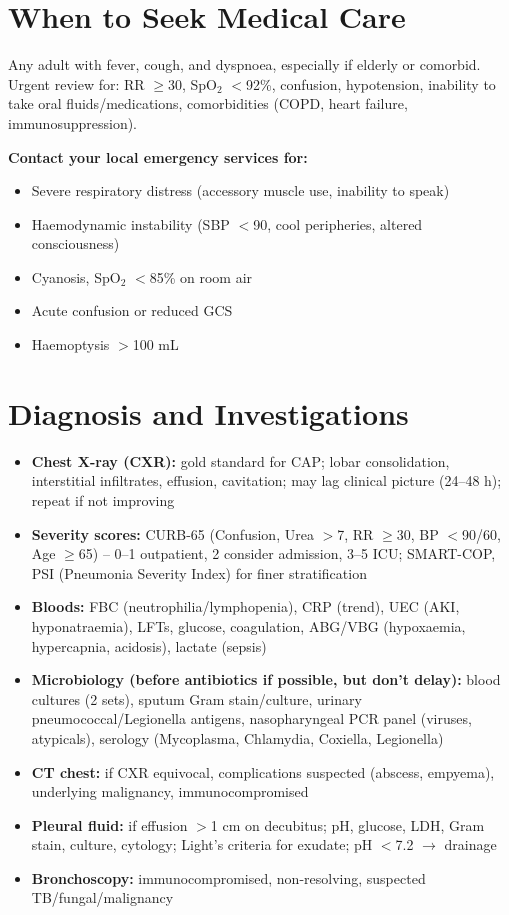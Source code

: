 \section*{When to Seek Medical Care}
Any adult with fever, cough, and dyspnoea, especially if elderly or comorbid. Urgent review for: RR $\ge$30, SpO$_2$ $<$92\%, confusion, hypotension, inability to take oral fluids/medications, comorbidities (COPD, heart failure, immunosuppression).

\textbf{Contact your local emergency services for:}
\begin{itemize}
    \item Severe respiratory distress (accessory muscle use, inability to speak)
    \item Haemodynamic instability (SBP $<$90, cool peripheries, altered consciousness)
    \item Cyanosis, SpO$_2$ $<$85\% on room air
    \item Acute confusion or reduced GCS
    \item Haemoptysis $>$100 mL
\end{itemize}

\section*{Diagnosis and Investigations}
\begin{itemize}
    \item \textbf{Chest X-ray (CXR):} gold standard for CAP; lobar consolidation, interstitial infiltrates, effusion, cavitation; may lag clinical picture (24--48 h); repeat if not improving
    \item \textbf{Severity scores:} CURB-65 (Confusion, Urea $>$7, RR $\ge$30, BP $<$90/60, Age $\ge$65) -- 0--1 outpatient, 2 consider admission, 3--5 ICU; SMART-COP, PSI (Pneumonia Severity Index) for finer stratification
    \item \textbf{Bloods:} FBC (neutrophilia/lymphopenia), CRP (trend), UEC (AKI, hyponatraemia), LFTs, glucose, coagulation, ABG/VBG (hypoxaemia, hypercapnia, acidosis), lactate (sepsis)
    \item \textbf{Microbiology (before antibiotics if possible, but don't delay):} blood cultures (2 sets), sputum Gram stain/culture, urinary pneumococcal/Legionella antigens, nasopharyngeal PCR panel (viruses, atypicals), serology (Mycoplasma, Chlamydia, Coxiella, Legionella)
    \item \textbf{CT chest:} if CXR equivocal, complications suspected (abscess, empyema), underlying malignancy, immunocompromised
    \item \textbf{Pleural fluid:} if effusion $>$1 cm on decubitus; pH, glucose, LDH, Gram stain, culture, cytology; Light's criteria for exudate; pH $<$7.2 $\to$ drainage
    \item \textbf{Bronchoscopy:} immunocompromised, non-resolving, suspected TB/fungal/malignancy
\end{itemize}


